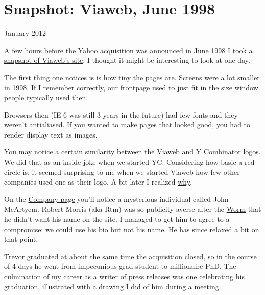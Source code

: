 \chapter{Snapshot: Viaweb, June 1998}


            
              
                

January 2012

A few hours before the Yahoo
                  acquisition was announced in June 1998 I took a
                  \href{http://ycombinator.com/viaweb}{snapshot of Viaweb's site}. I thought it might be interesting to look at one day.

The
                  first thing one notices is is how tiny the pages are. Screens
                  were a lot smaller in 1998. If I remember correctly, our
                  frontpage used to just fit in the size window people typically
                  used then.

Browsers then (IE 6 was still 3 years in
                  the future) had few fonts and they weren't antialiased. If you
                  wanted to make pages that looked good, you had to render
                  display text as images.

You may notice a certain
                  similarity between the Viaweb and
                  \href{http://ycombinator.com}{Y Combinator} logos. We
                  did that as an inside joke when we started YC. Considering how
                  basic a red circle is, it seemed surprising to me when we
                  started Viaweb how few other companies used one as their logo.
                  A bit later I realized
                  \href{http://www.paulgraham.com/zero.html}{why}.

On the
                  \href{http://www.ycombinator.com/viaweb/com.html}{Company page}
                  you'll notice a mysterious individual called John McArtyem.
                  Robert Morris (aka Rtm) was so publicity averse after the
                  \href{http://en.wikipedia.org/wiki/Morris\_worm}{Worm}
                  that he didn't want his name on the site. I managed to get him
                  to agree to a compromise: we could use his bio but not his
                  name. He has since
                  \href{http://ycombinator.com/people.html}{relaxed} a bit
                  on that point.

Trevor graduated at about the same
                  time the acquisition closed, so in the course of 4 days he
                  went from impecunious grad student to millionaire PhD. The
                  culmination of my career as a writer of press releases was one
                  \href{http://ycombinator.com/viaweb/trevor.html}{celebrating his graduation}, illustrated with a drawing I did of him during a
                  meeting.


